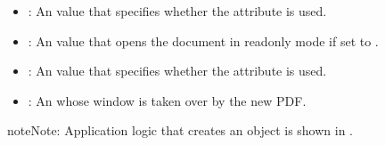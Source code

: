 \documentclass[letterpaper,12pt,english,openany,oneside]{sphinxmanual}
\begin{document}
\begin{itemize}
\begin{itemize}
\item {} 
: Embeds the PDF file in an external document such as an HTML file. The first page of the PDF is displayed; however, user\sphinxhyphen{}interface component such as scroll bars, toolbars, bookmarks, and the thumbnails pane are not displayed. Annotations, such as links, are not displayed or active.

\end{itemize}

\item {} 
: An  value that specifies whether the  attribute is used.

\item {} 
: An  value that opens the document in read\sphinxhyphen{}only mode if set to .

\item {} 
: An  value that specifies whether the  attribute is used.

\item {} 
: An  whose window is taken over by the new PDF.

\end{itemize}

\begin{sphinxadmonition}{note}{Note:}
Application logic that creates an  object is shown in .
\end{sphinxadmonition}
\end{document}
